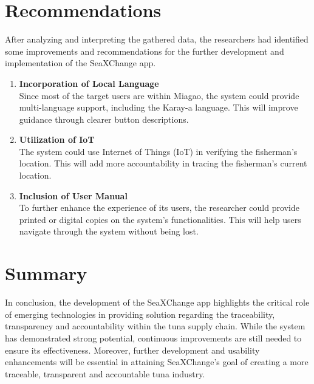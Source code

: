 \section{Recommendations}
After analyzing and interpreting the gathered data, the researchers had identified some improvements and recommendations for the further development and implementation of the SeaXChange app.
\begin{enumerate}
	\item \textbf{Incorporation of Local Language}
	\\Since most of the target users are within Miagao, the system could provide multi-language support, including the Karay-a language. This will improve guidance through clearer button descriptions.
	
	\item \textbf{Utilization of IoT}
	\\The system could use Internet of Things (IoT) in verifying the fisherman's location. This will add more accountability in tracing the fisherman's current location.
	
	\item \textbf{Inclusion of User Manual }
	\\To further enhance the experience of its users, the researcher could provide printed or digital copies on the system's functionalities. This will help users navigate through the system without being lost.
\end{enumerate}

\section{Summary}
\noindent In conclusion, the development of the SeaXChange app highlights the critical role of emerging technologies in providing solution regarding the traceability, transparency and accountability within the tuna supply chain. While the system has demonstrated strong potential, continuous improvements are still needed to ensure its effectiveness. Moreover, further development and usability enhancements will be essential in attaining SeaXChange's goal of creating a more traceable, transparent and accountable tuna industry.
